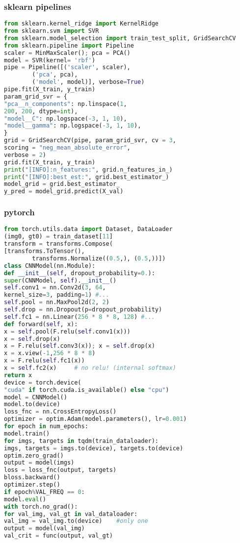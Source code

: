 \subsubsection{sklearn pipelines}
\begin{footnotesize}
    \begin{lstlisting}[language=Python]
from sklearn.kernel_ridge import KernelRidge
from sklearn.svm import SVR
from sklearn.model_selection import train_test_split, GridSearchCV
from sklearn.pipeline import Pipeline
scaler = MinMaxScaler(); pca = PCA()
model = SVR(kernel= 'rbf')
pipe = Pipeline([('scaler', scaler),
        ('pca', pca),
        ('model', model)], verbose=True)
pipe.fit(X_train, y_train)
param_grid_svr = {
"pca__n_components": np.linspace(1,
200, 200, dtype=int),
"model__C": np.logspace(-3, 1, 10),
"model__gamma": np.logspace(-3, 1, 10),
}
grid = GridSearchCV(pipe, param_grid_svr, cv = 3,
scoring = "neg_mean_absolute_error",
verbose = 2)
grid.fit(X_train, y_train)
print("[INFO]:n_features:", grid.n_features_in_)
print("[INFO]:best_est:", grid.best_estimator_)
model_grid = grid.best_estimator_
y_pred = model_grid.predict(X_val)    
\end{lstlisting}
\end{footnotesize}



\subsubsection{pytorch}
\begin{footnotesize}
    \begin{lstlisting}[language=Python]
from torch.utils.data import Dataset, DataLoader
(img0, gt0) = train_dataset[11]
transform = transforms.Compose(
[transforms.ToTensor(),
        transforms.Normalize((0.5,), (0.5,))])
class CNNModel(nn.Module):
def __init__(self, dropout_probability=0.):
super(CNNModel, self).__init__()
self.conv1 = nn.Conv2d(3, 64,
kernel_size=3, padding=1) #...
self.pool = nn.MaxPool2d(2, 2)
self.drop = nn.Dropout(p=dropout_probability)
self.fc1 = nn.Linear(256 * 8 * 8, 128) #...
def forward(self, x):
x = self.pool(F.relu(self.conv1(x)))
x = self.drop(x)
x = F.relu(self.conv3(x)); x = self.drop(x)
x = x.view(-1,256 * 8 * 8)
x = F.relu(self.fc1(x))
x = self.fc2(x)     # no relu! (internal softmax)
return x
device = torch.device(
"cuda" if torch.cuda.is_available() else "cpu")
model = CNNModel()
model.to(device)
loss_fnc = nn.CrossEntropyLoss()
optimizer = optim.Adam(model.parameters(), lr=0.001)
for epoch in num_epochs:
model.train()
for imgs, targets in tqdm(train_dataloader):
imgs, targets = imgs.to(device), targets.to(device)
optim.zero_grad()
output = model(imgs)
loss = loss_fnc(output, targets)
bloss.backward()
optimizer.step()
if epoch%VAL_FREQ == 0:
model.eval()
with torch.no_grad():
for val_img, val_gt in val_dataloader:
val_img = val_img.to(device)    #only one
output = model(val_img)
val_crit = func(output, val_gt)    
    \end{lstlisting}
\end{footnotesize}

